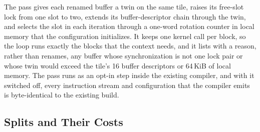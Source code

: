 The pass gives each renamed buffer a twin on the same tile, raises its free-slot lock from one slot to two, extends its buffer-descriptor chain through the twin, and selects the slot in each iteration through a one-word rotation counter in local memory that the configuration initializes.
It keeps one kernel call per block, so the loop runs exactly the blocks that the context needs, and it lists with a reason, rather than renames, any buffer whose synchronization is not one lock pair or whose twin would exceed the tile's 16 buffer descriptors or 64\,KiB of local memory.
The pass runs as an opt-in step inside the existing compiler, and with it switched off, every instruction stream and configuration that the compiler emits is byte-identical to the existing build.

\subsection{Splits and Their Costs}
\label{app:relayout}

